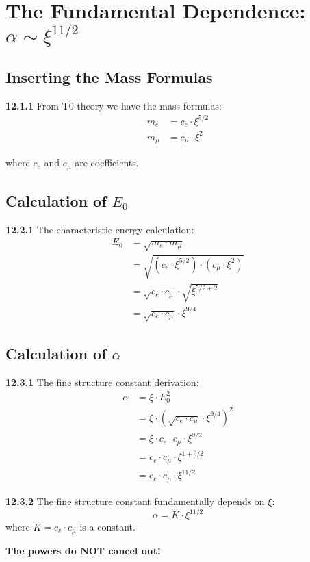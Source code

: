 \documentclass[12pt,a4paper]{article}
\begin{document}
\section{The Fundamental Dependence: $\alpha \sim \xi^{11/2}$}

\subsection{Inserting the Mass Formulas}

\noindent \textbf{12.1.1} From T0-theory we have the mass formulas:
\begin{align}
	m_e &= c_e \cdot \xi^{5/2} \\
	m_\mu &= c_\mu \cdot \xi^2
\end{align}

where $c_e$ and $c_\mu$ are coefficients.

\subsection{Calculation of $E_0$}

\noindent \textbf{12.2.1} The characteristic energy calculation:
\begin{align}
	E_0 &= \sqrt{m_e \cdot m_\mu} \\
	&= \sqrt{(c_e \cdot \xi^{5/2}) \cdot (c_\mu \cdot \xi^2)} \\
	&= \sqrt{c_e \cdot c_\mu} \cdot \sqrt{\xi^{5/2 + 2}} \\
	&= \sqrt{c_e \cdot c_\mu} \cdot \xi^{9/4}
\end{align}

\subsection{Calculation of $\alpha$}

\noindent \textbf{12.3.1} The fine structure constant derivation:
\begin{align}
	\alpha &= \xi \cdot E_0^2 \\
	&= \xi \cdot (\sqrt{c_e \cdot c_\mu} \cdot \xi^{9/4})^2 \\
	&= \xi \cdot c_e \cdot c_\mu \cdot \xi^{9/2} \\
	&= c_e \cdot c_\mu \cdot \xi^{1 + 9/2} \\
	&= c_e \cdot c_\mu \cdot \xi^{11/2}
\end{align}

\begin{tcolorbox}[colback=red!5!white,colframe=red!75!black,title=\textbf{IMPORTANT RESULT}]
	\noindent \textbf{12.3.2} The fine structure constant fundamentally depends on $\xi$:
	\begin{equation}
		\boxed{\alpha = K \cdot \xi^{11/2}}
	\end{equation}
	where $K = c_e \cdot c_\mu$ is a constant.
	
	\textbf{The powers do NOT cancel out!}
\end{tcolorbox}
\end{document}
